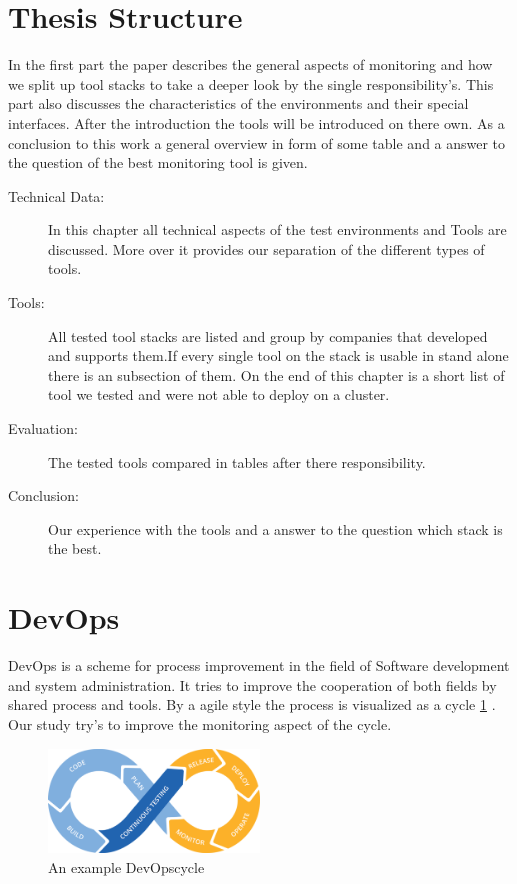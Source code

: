 \section{Thesis Structure}
In the first part the paper describes the general aspects of monitoring and how we split up tool stacks to take a deeper look by the single responsibility's. This part also discusses the characteristics of the environments and their special interfaces. After the introduction the tools will be introduced on there own. As a conclusion to this work a general overview in form of some table and a answer to the question of the best monitoring tool is given. 
\begin{description}
\item[Technical Data:] In this chapter all technical aspects of the test environments and Tools are discussed. More over it provides our separation of the different types of tools. 
\item[Tools:] All tested tool stacks are listed and group by companies that developed and supports them.If every single tool on the stack is usable in stand alone there is an subsection of them. On the end of this chapter is a short list of tool we tested and were not able to deploy on a cluster.
\item[Evaluation:]The tested tools compared in tables after there responsibility.
\item[Conclusion:] Our experience with the tools and a answer to the question which stack is the best.

\end{description}


\section{DevOps}
\label{devops}
DevOps is a scheme for process improvement in the field of Software development and system administration. It tries to improve the cooperation of both fields by shared process and tools.
By a agile style the process is visualized as a cycle \cref{fig:devopscycle} \cite{Devops}. Our study try's to improve the monitoring aspect of the cycle.
\begin{figure}
	\centering
	\includegraphics[width=0.5\textwidth]{Bilder/devopscycle}
	\caption{An example DevOpscycle}
	\label{fig:devopscycle}
\end{figure}